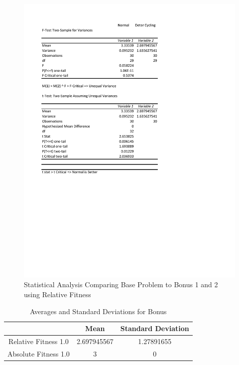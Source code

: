 \documentclass[times]{article}
\begin{document}
	\begin{figure}
		\caption{Statistical Analysis Comparing Base Problem to Bonus 1 and 2 using Relative Fitness}
		\label{fig:stat_rel_bonus}
		\includegraphics[width=\textwidth]{./pictures/stat_rel_bonus.pdf}
	\end{figure}

	\begin{table}
		\centering
		\caption{Averages and Standard Deviations for Bonus}
		\label{tab:std_mean_bonus}
		\begin{tabular}{| c | c | c |}
			\hline
									& Mean 		& Standard Deviation 	\\
			\hline
			Relative Fitness 1.0	& 2.697945567 & 1.27891655			\\
			\hline
			Absolute Fitness 1.0	& 3			 & 0					\\
			\hline
		\end{tabular}
	\end{table}
		
\end{document}
